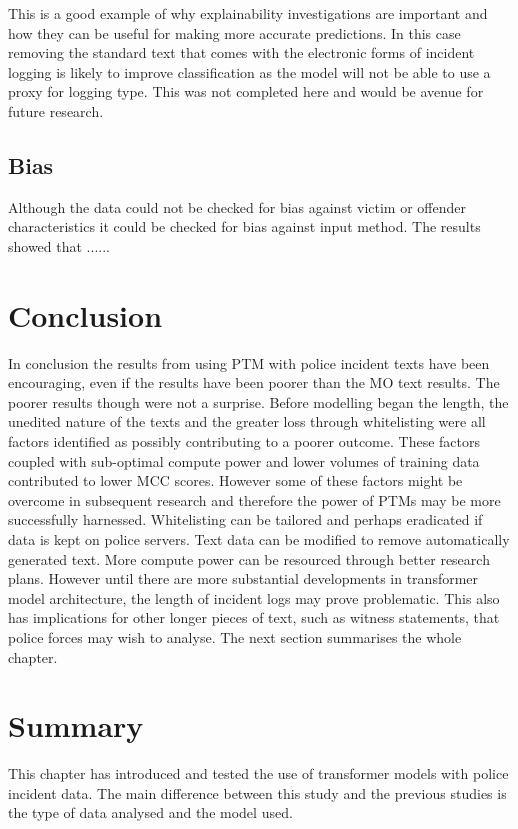 This is a good example of why explainability investigations are important and how they can be useful for making more accurate predictions. In this case removing the standard text that comes with the electronic forms of incident logging is likely to improve classification as the model will not be able to use a proxy for logging type. This was not completed here and would be avenue for future research.

 

\subsection{Bias}Although the data could not be checked for bias against victim or offender characteristics it could be checked for bias against input method. The results showed that ......



\section{Conclusion} In conclusion the results from using PTM with police incident texts have been encouraging, even if the results have been poorer than the MO text results. The poorer results though were not a surprise. Before modelling began the length, the unedited nature of the texts and the greater loss through whitelisting were all factors identified as possibly contributing to a poorer outcome. These factors coupled with sub-optimal compute power and lower volumes of training data contributed to lower MCC scores. However some of these factors might be overcome in subsequent research and therefore the power of PTMs may be more successfully harnessed. Whitelisting can be tailored and perhaps eradicated if data is kept on police servers. Text data can be modified to remove automatically generated text. More compute power can be resourced through better research plans. However until there are more substantial developments in transformer model architecture, the length of incident logs may prove problematic. This also has implications for other longer pieces of text, such as witness statements, that police forces may wish to analyse. The next section summarises the whole chapter.

\section{Summary} This chapter has introduced and tested the use of transformer models with police incident data. The main difference between this study and the previous studies is the type of data analysed and the model used. 

